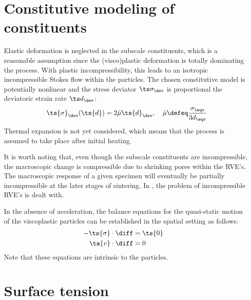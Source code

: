 \documentclass[ExampleMasters.tex]{subfiles}
\begin{document}
\section{Constitutive modeling of constituents}
Elastic deformation is neglected in the subscale constituents, which is a reasonable assumption since the (visco)plastic deformation is totally dominating the process.
With plastic incompressibility, this leads to an isotropic incompressible Stokes flow within the particles.
The chosen constitutive model is potentially nonlinear and the stress deviator $\ts\sigma_\dev$ is proportional the deviatoric strain rate $\ts d_\dev$:
\begin{equation}
    \ts{\sigma}_\dev(\ts{d}) = 2\tilde{\mu}\ts{d}_\dev, \quad
    \tilde{\mu}\defeq \frac{\sigma_\eqv}{3d_\eqv}
\end{equation}
Thermal expansion is not yet considered, which means that the process is assumed to take place after initial heating.

It is worth noting that, even though the subscale constituents are incompressible, the macroscopic change is compressible due to shrinking pores within the RVE's. The macroscopic response of a given specimen will eventually be partially incompressible at the later stages of sintering. 
In , the problem of incompressible RVE's is dealt with.

In the absence of acceleration, the balance equations for the quasi-static motion of the viscoplastic particles can be established in the spatial setting as follows:
\begin{subequations}\label{eq:stokesflow}
\begin{align}
    -\ts{\sigma}\cdot\diff & = \ts{0} \quad%
\label{eq:stokesflow_momentum}
\\
    \ta{v}\cdot\diff & = 0 \quad%
\label{eq:stokesflow_continuity}
\end{align}
\end{subequations}
Note that these equations are intrinsic to the particles.

\section{Surface tension}
\end{document}
